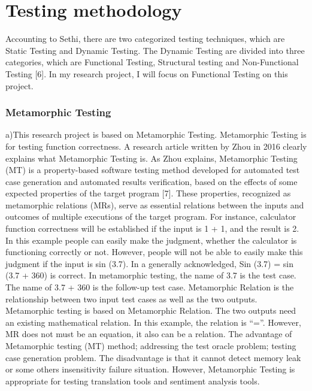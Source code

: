 \documentclass[conference,compsoc]{IEEEtran}
\begin{document}
\section{Testing methodology}
Accounting to Sethi, there are two categorized testing techniques, which are
Static Testing and Dynamic Testing. The Dynamic Testing are divided into three
categories, which are Functional Testing, Structural testing and Non-Functional
Testing [6]. In my research project, I will focus on Functional Testing on this
project.

\subsubsection{Metamorphic Testing}
a)This research project is based on Metamorphic Testing. Metamorphic Testing is for testing function correctness. A research article written by Zhou in 2016 clearly explains what Metamorphic Testing is. As Zhou explains, Metamorphic Testing (MT) is a property-based software testing method developed for automated test case generation and automated results verification, based on the effects of some expected properties of the target program [7]. These properties, recognized as metamorphic relations (MRs), serve as essential relations between the inputs and outcomes of multiple executions of the target program. For instance, calculator function correctness will be established if the input is 1 + 1, and the result is 2. In this example people can easily make the judgment, whether the calculator is functioning correctly or not. However, people will not be able to easily make this judgment if the input is sin (3.7). In a generally acknowledged, Sin (3.7) = sin (3.7 + 360) is correct. In metamorphic testing, the name of 3.7 is the test case. The name of 3.7 + 360 is the follow-up test case. Metamorphic Relation is the relationship between two input test cases as well as the two outputs.
Metamorphic testing is based on Metamorphic Relation. The two outputs need an
existing mathematical relation. In this example, the relation is “=”. However,
MR does not must be an equation, it also can be a relation. The advantage of
Metamorphic testing (MT) method; addressing the test oracle problem; testing
case generation problem. The disadvantage is that it cannot detect memory leak
or some others insensitivity failure situation. However, Metamorphic Testing is
appropriate for testing translation tools and sentiment analysis tools.
\end{document}

